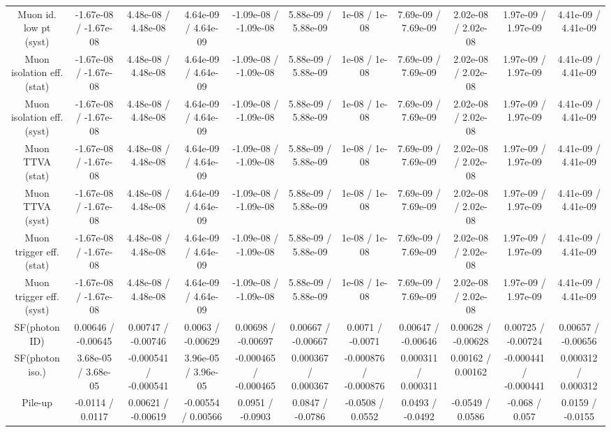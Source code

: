 \begin{table}[htbp]
\begin{center}
\begin{tabular}{|c|c|c|c|c|c|c|c|c|c|c|}
  Muon id. low pt (syst) & -1.67e-08 / -1.67e-08 & 4.48e-08 / 4.48e-08 & 4.64e-09 / 4.64e-09 & -1.09e-08 / -1.09e-08 & 5.88e-09 / 5.88e-09 & 1e-08 / 1e-08 & 7.69e-09 / 7.69e-09 & 2.02e-08 / 2.02e-08 & 1.97e-09 / 1.97e-09 & 4.41e-09 / 4.41e-09 \\ 
  Muon isolation eff. (stat) & -1.67e-08 / -1.67e-08 & 4.48e-08 / 4.48e-08 & 4.64e-09 / 4.64e-09 & -1.09e-08 / -1.09e-08 & 5.88e-09 / 5.88e-09 & 1e-08 / 1e-08 & 7.69e-09 / 7.69e-09 & 2.02e-08 / 2.02e-08 & 1.97e-09 / 1.97e-09 & 4.41e-09 / 4.41e-09 \\ 
  Muon isolation eff. (syst) & -1.67e-08 / -1.67e-08 & 4.48e-08 / 4.48e-08 & 4.64e-09 / 4.64e-09 & -1.09e-08 / -1.09e-08 & 5.88e-09 / 5.88e-09 & 1e-08 / 1e-08 & 7.69e-09 / 7.69e-09 & 2.02e-08 / 2.02e-08 & 1.97e-09 / 1.97e-09 & 4.41e-09 / 4.41e-09 \\ 
  Muon TTVA (stat) & -1.67e-08 / -1.67e-08 & 4.48e-08 / 4.48e-08 & 4.64e-09 / 4.64e-09 & -1.09e-08 / -1.09e-08 & 5.88e-09 / 5.88e-09 & 1e-08 / 1e-08 & 7.69e-09 / 7.69e-09 & 2.02e-08 / 2.02e-08 & 1.97e-09 / 1.97e-09 & 4.41e-09 / 4.41e-09 \\ 
  Muon TTVA (syst) & -1.67e-08 / -1.67e-08 & 4.48e-08 / 4.48e-08 & 4.64e-09 / 4.64e-09 & -1.09e-08 / -1.09e-08 & 5.88e-09 / 5.88e-09 & 1e-08 / 1e-08 & 7.69e-09 / 7.69e-09 & 2.02e-08 / 2.02e-08 & 1.97e-09 / 1.97e-09 & 4.41e-09 / 4.41e-09 \\ 
  Muon trigger eff. (stat) & -1.67e-08 / -1.67e-08 & 4.48e-08 / 4.48e-08 & 4.64e-09 / 4.64e-09 & -1.09e-08 / -1.09e-08 & 5.88e-09 / 5.88e-09 & 1e-08 / 1e-08 & 7.69e-09 / 7.69e-09 & 2.02e-08 / 2.02e-08 & 1.97e-09 / 1.97e-09 & 4.41e-09 / 4.41e-09 \\ 
  Muon trigger eff. (syst) & -1.67e-08 / -1.67e-08 & 4.48e-08 / 4.48e-08 & 4.64e-09 / 4.64e-09 & -1.09e-08 / -1.09e-08 & 5.88e-09 / 5.88e-09 & 1e-08 / 1e-08 & 7.69e-09 / 7.69e-09 & 2.02e-08 / 2.02e-08 & 1.97e-09 / 1.97e-09 & 4.41e-09 / 4.41e-09 \\ 
  SF(photon ID) & 0.00646 / -0.00645 & 0.00747 / -0.00746 & 0.0063 / -0.00629 & 0.00698 / -0.00697 & 0.00667 / -0.00667 & 0.0071 / -0.0071 & 0.00647 / -0.00646 & 0.00628 / -0.00628 & 0.00725 / -0.00724 & 0.00657 / -0.00656 \\ 
  SF(photon iso.) & 3.68e-05 / 3.68e-05 & -0.000541 / -0.000541 & 3.96e-05 / 3.96e-05 & -0.000465 / -0.000465 & 0.000367 / 0.000367 & -0.000876 / -0.000876 & 0.000311 / 0.000311 & 0.00162 / 0.00162 & -0.000441 / -0.000441 & 0.000312 / 0.000312 \\ 
  Pile-up & -0.0114 / 0.0117 & 0.00621 / -0.00619 & -0.00554 / 0.00566 & 0.0951 / -0.0903 & 0.0847 / -0.0786 & -0.0508 / 0.0552 & 0.0493 / -0.0492 & -0.0549 / 0.0586 & -0.068 / 0.057 & 0.0159 / -0.0155 \\ 

\end{tabular}
\end{center}
\end{table}
